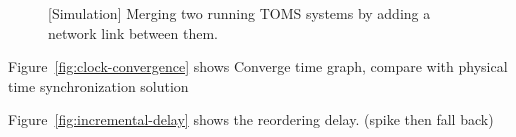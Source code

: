 \begin{figure}[t]
\centering
        \hspace{0.01\textwidth}
\caption{[Simulation] Merging two running TOMS systems by adding a network link between them.}
\label{fig:incremental}
\end{figure}

Figure~\ref{fig:clock-convergence} shows
Converge time graph, compare with physical time synchronization solution

Figure~\ref{fig:incremental-delay} shows the reordering delay. (spike then fall back)
\fi
